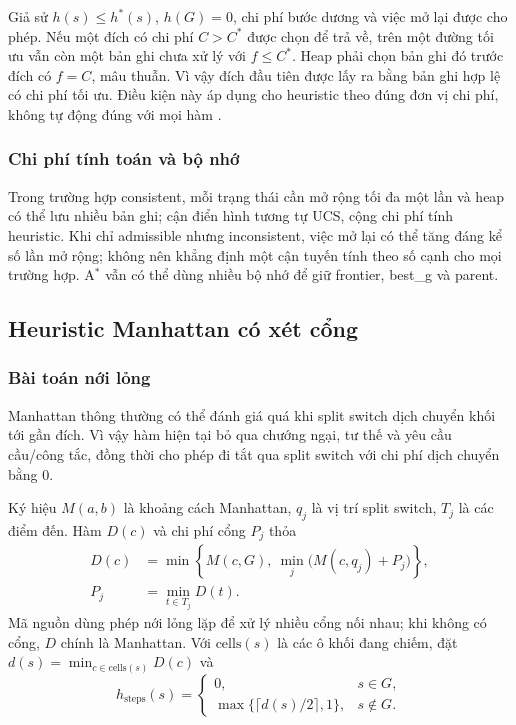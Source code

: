 \documentclass[a4paper]{article}
\newcommand{\tep}[1]{{\small\ttfamily\detokenize{#1}}}
\newcommand{\astar}{\texorpdfstring{A\ensuremath{^*}}{A*}}
\begin{document}
Giả sử $h(s)\le h^*(s)$, $h(G)=0$, chi phí bước dương và việc mở lại được cho phép. Nếu một đích có chi phí $C>C^*$ được chọn để trả về, trên một đường tối ưu vẫn còn một bản ghi chưa xử lý với $f\le C^*$. Heap phải chọn bản ghi đó trước đích có $f=C$, mâu thuẫn. Vì vậy đích đầu tiên được lấy ra bằng bản ghi hợp lệ có chi phí tối ưu. Điều kiện này áp dụng cho heuristic theo đúng đơn vị chi phí, không tự động đúng với mọi hàm \tep{cost_fn}.

\subsubsection{Chi phí tính toán và bộ nhớ}
Trong trường hợp consistent, mỗi trạng thái cần mở rộng tối đa một lần và heap có thể lưu nhiều bản ghi; cận điển hình tương tự UCS, cộng chi phí tính heuristic. Khi chỉ admissible nhưng inconsistent, việc mở lại có thể tăng đáng kể số lần mở rộng; không nên khẳng định một cận tuyến tính theo số cạnh cho mọi trường hợp. \astar{} vẫn có thể dùng nhiều bộ nhớ để giữ frontier, best\_g và parent.




\subsection{Heuristic Manhattan có xét cổng}
\subsubsection{Bài toán nới lỏng}
Manhattan thông thường có thể đánh giá quá khi split switch dịch chuyển khối tới gần đích. Vì vậy hàm hiện tại bỏ qua chướng ngại, tư thế và yêu cầu cầu/công tắc, đồng thời cho phép đi tắt qua split switch với chi phí dịch chuyển bằng 0.

Ký hiệu $M(a,b)$ là khoảng cách Manhattan, $q_j$ là vị trí split switch, $T_j$ là các điểm đến. Hàm $D(c)$ và chi phí cổng $P_j$ thỏa
\begin{align}
D(c)&=\min\left\{M(c,G),\ \min_j\big(M(c,q_j)+P_j\big)\right\},\\
P_j&=\min_{t\in T_j} D(t).
\end{align}
Mã nguồn dùng phép nới lỏng lặp để xử lý nhiều cổng nối nhau; khi không có cổng, $D$ chính là Manhattan. Với $\mathrm{cells}(s)$ là các ô khối đang chiếm, đặt $d(s)=\min_{c\in\mathrm{cells}(s)}D(c)$ và
\begin{equation}\label{eq:h}
h_{\mathrm{steps}}(s)=
\begin{cases}
0,&s\in G,\\
\max\{\lceil d(s)/2\rceil,1\},&s\notin G.
\end{cases}
\end{equation}
\end{document}
